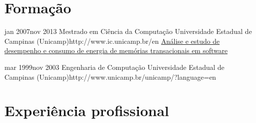 \documentclass[10pt]{article} %
\begin{document}


\section{Formação}

\education
{jan 2007}{nov 2013}
{Mestrado em Ciência da Computação}
{Universidade Estadual de Campinas (Unicamp)}{http://www.ic.unicamp.br/en}
{\href{http://repositorio.unicamp.br/jspui/handle/REPOSIP/275619}{Análise e estudo de desempenho e consumo de energia de memórias transacionais em software}}


\education
{mar 1999}{nov 2003}
{Engenharia de Computação}
{Universidade Estadual de Campinas (Unicamp)}{http://www.unicamp.br/unicamp/?language=en}



\section{Experiência profissional}
\end{document}
